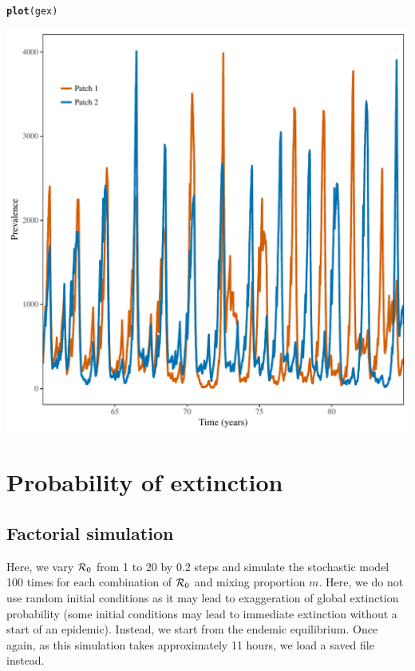 \documentclass[12pt]{article}\usepackage[]{graphicx}\usepackage[]{color}
\makeatletter
\def\maxwidth{ %
  \ifdim\Gin@nat@width>\linewidth
    \linewidth
  \else
    \Gin@nat@width
  \fi
}
\newcommand{\hlstd}[1]{\textcolor[rgb]{0.345,0.345,0.345}{#1}}%
\newcommand{\hlkwd}[1]{\textcolor[rgb]{0.737,0.353,0.396}{\textbf{#1}}}%
\newenvironment{kframe}{%
 \def\at@end@of@kframe{}%
 \ifinner\ifhmode%
  \def\at@end@of@kframe{\end{minipage}}%
  \begin{minipage}{\columnwidth}%
 \fi\fi%
 \def\FrameCommand##1{\hskip\@totalleftmargin \hskip-\fboxsep
 \colorbox{shadecolor}{##1}\hskip-\fboxsep
     \hskip-\linewidth \hskip-\@totalleftmargin \hskip\columnwidth}%
 \MakeFramed {\advance\hsize-\width
   \@totalleftmargin\z@ \linewidth\hsize
   \@setminipage}}%
 {\par\unskip\endMakeFramed%
 \at@end@of@kframe}
\newenvironment{knitrout}{}{} %
\newcommand{\R}{{\cal R}}
\makeatother
\begin{document}
\begin{knitrout}
\begin{kframe}
\begin{alltt}
\hlkwd{plot}\hlstd{(gex)}
\end{alltt}
\end{kframe}
\includegraphics[width=\maxwidth]{figure/unnamed-chunk-2-1} 

\end{knitrout}


\section{Probability of extinction}

\subsection{Factorial simulation}

Here, we vary $\R_0$ from 1 to 20 by 0.2 steps and simulate the stochastic model 100 times for each combination of $\R_0$ and mixing proportion $m$.
Here, we do not use random initial conditions as it may lead to exaggeration of global extinction probability (some initial conditions may lead to immediate extinction without a start of an epidemic).
Instead, we start from the endemic equilibrium.
Once again, as this simulation takes approximately 11 hours, we load a saved file instead.
\end{document}

